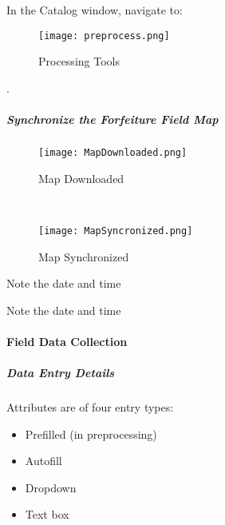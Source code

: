\noindent In the Catalog window, navigate to:
 {\scriptsize{}}

 \begin{wrapfigure}{r}{0.5\textwidth}
 \centering
     \texttt{[image: preprocess.png]}
 \vspace{-.1in}

 \caption{Processing Tools}
 \end{wrapfigure}
 .
 \vspace{2in}

 {\LARGE\noindent{}  \lookArrow}
 \vspace{.5in}

 {\LARGE\noindent{} \lookArrow}


 \clearpage


 \subparagraph{Synchronize the Forfeiture Field Map}

 \begin{wrapfigure}{r}{0.5\textwidth}
 \centering
     \texttt{[image: MapDownloaded.png]}
 \caption{Map Downloaded}
 \vspace{.25in}

 \HRule \\[.4cm] %
 \vspace{.25in}

     \texttt{[image: MapSyncronized.png]}
 \caption{Map Synchronized}
 \end{wrapfigure}
 Note the date and time
 \vspace{1in}

 \vspace{3in}

 \noindent Note the date and time
 \vspace{1in}

 \clearpage

 \paragraph{Field Data Collection}
 \subparagraph{Data Entry Details}

 Attributes are of four entry types:
 \begin{itemize}
 \item Prefilled {\scriptsize (in preprocessing)}
 \item Autofill
 \item Dropdown
 \item Text box
 \end{itemize}
 \vspace{1in}

